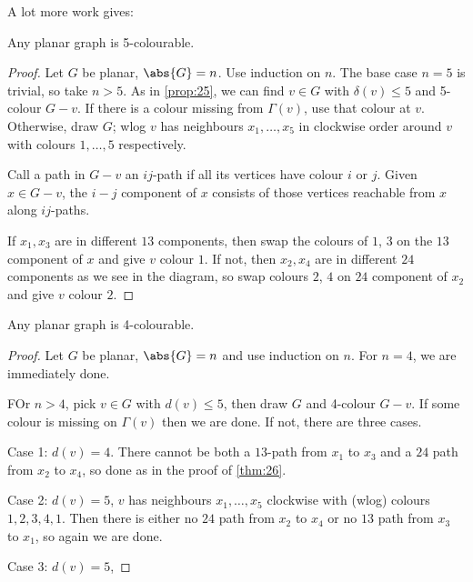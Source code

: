 \documentclass{article}
\begin{document}
A lot more work gives:
\begin{nthm}\label{thm:26}
    Any planar graph is 5-colourable.
\end{nthm}
\begin{proof}
    Let $G$ be planar, $\abs{G} = n$. Use induction on $n$. The base case $n=5$ is trivial, so take $n > 5$.
    As in \cref{prop:25}, we can find $v \in G$ with $\delta(v) \leq 5$ and 5-colour $G-v$.
    If there is a colour missing from $\Gamma(v)$, use that colour at $v$.
    Otherwise, draw $G$; wlog $v$ has neighbours $x_1, \dotsc, x_5$ in clockwise order around $v$ with colours $1, \dotsc, 5$ respectively.

    Call a path in $G-v$ an $ij$-path if all its vertices have colour $i$ or $j$.
    Given $x \in G-v$, the $i-j$ component of $x$ consists of those vertices reachable from $x$ along $ij$-paths.

    If $x_1, x_3$ are in different $13$ components, then swap the colours of $1$, $3$ on the $13$ component of $x$ and give $v$ colour $1$.
    If not, then $x_2, x_4$ are in different $24$ components as we see in the diagram, so swap colours $2$, $4$ on $24$ component of $x_2$ and give $v$ colour $2$.
\end{proof}

\begin{thm}\label{thm:27}
    Any planar graph is 4-colourable.
\end{thm}

\begin{proof}
    Let $G$ be planar, $\abs{G} = n$ and use induction on $n$. For $n=4$, we are immediately done.

    FOr $n > 4$, pick $v \in G$ with $d(v) \leq 5$, then draw $G$ and 4-colour $G-v$.
    If some colour is missing on $\Gamma(v)$ then we are done.
    If not, there are three cases.

    Case 1: $d(v) = 4$. There cannot be both a $13$-path from $x_1$ to $x_3$ and a $24$ path from $x_2$ to $x_4$, so done as in the proof of \cref{thm:26}.

    Case 2: $d(v) = 5$, $v$ has neighbours $x_1, \dotsc, x_5$ clockwise with (wlog) colours $1,2,3,4,1$.
    Then there is either no $24$ path from $x_2$ to $x_4$ or no $13$ path from $x_3$ to $x_1$, so again we are done.

    Case 3: $d(v) = 5$, %
\end{proof}

\end{document}
